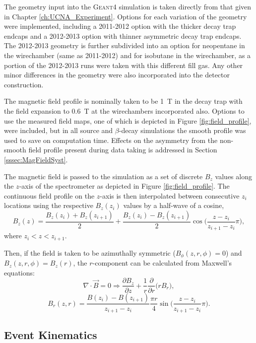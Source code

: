 The geometry input into the \textsc{Geant4} simulation is taken directly from
that given in Chapter \ref{ch:UCNA_Experiment}. Options for each variation
of the geometry were implemented, including a 2011-2012 option with
the thicker decay trap endcaps and a 2012-2013 option with thinner asymmetric
decay trap endcaps. The 2012-2013 geometry is further subdivided into an option
for neopentane in the wirechamber (same as 2011-2012) and for isobutane in the
wirechamber, as a portion of the 2012-2013 runs were taken with this
different fill gas. Any other minor differences in the geometry were also
incorporated into the detector construction.

The magnetic field profile is nominally taken to be 1~T in the decay trap
with the field expansion to 0.6~T at the wirechambers incorporated also.
Options to use the measured field maps, one of which is depicted in
Figure \ref{fig:field_profile}, were included, but in all source
and $\beta$-decay simulations the smooth profile was used to save on
computation time. Effects on the asymmetry from the non-smooth
field profile present during data taking is addressed in
Section \ref{sssec:MagFieldSyst}.

The magnetic field is passed to the simulation as a set of discrete $B_z$
values along the $z$-axis of the spectrometer as depicted in Figure \ref{fig:field_profile}.
The continuous field profile on the $z$-axis is then interpolated between consecutive $z_i$ locations
using the respective $B_z(z_i)$ values by a half-wave of a cosine,
%
\begin{equation}
  B_z(z) = \frac{B_z(z_i) + B_z(z_{i+1})}{2} + \frac{B_z(z_i) - B_z(z_{i+1})}{2}\cos\bigg(\frac{z-z_i}{z_{i+1}-z_i}\pi\bigg),
\end{equation}
%
where $z_i<z<z_{i+1}$.

Then, if the field is taken to be azimuthally symmetric ($B_\phi(z,r,\phi)=0$) and $B_z(z,r,\phi)=B_z(r)$,
the $r$-component can be calculated from Maxwell's equations:
%
\begin{equation}
  \nabla \cdot \vec{B} = 0 \Rightarrow \frac{\partial B_z}{\partial z} + \frac{1}{r}\frac{\partial}{\partial r}\big(rB_r\big), 
\end{equation}
\begin{equation}
  B_r(z,r) =  \frac{B(z_i) - B(z_{i+1})}{z_{i+1}-z_i}\frac{\pi r}{4}\sin\bigg(\frac{z-z_i}{z_{i+1}-z_i}\pi\bigg).
\end{equation}
%


\subsection{Event Kinematics}

